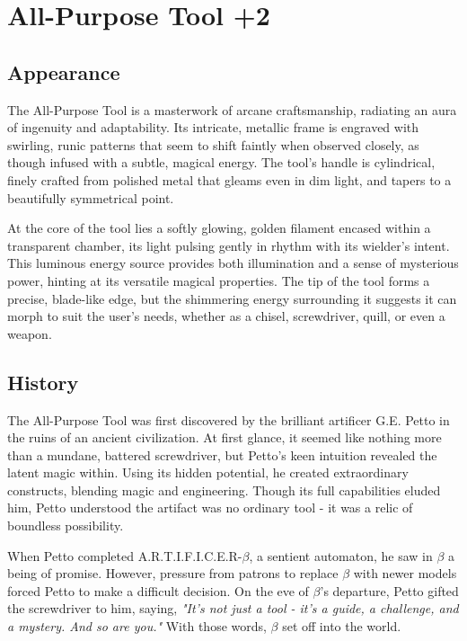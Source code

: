 \ItemSubCategory{}

\chapter*{All-Purpose Tool +2}
\section*{Appearance}
The All-Purpose Tool is a masterwork of arcane craftsmanship, radiating an aura of ingenuity and adaptability. Its intricate, metallic frame is engraved with swirling, runic patterns that seem to shift faintly when observed closely, as though infused with a subtle, magical energy. The tool's handle is cylindrical, finely crafted from polished metal that gleams even in dim light, and tapers to a beautifully symmetrical point.

At the core of the tool lies a softly glowing, golden filament encased within a transparent chamber, its light pulsing gently in rhythm with its wielder's intent. This luminous energy source provides both illumination and a sense of mysterious power, hinting at its versatile magical properties. The tip of the tool forms a precise, blade-like edge, but the shimmering energy surrounding it suggests it can morph to suit the user's needs, whether as a chisel, screwdriver, quill, or even a weapon.

\section*{History}
The All-Purpose Tool was first discovered by the brilliant artificer G.E. Petto in the ruins of an ancient civilization. At first glance, it seemed like nothing more than a mundane, battered screwdriver, but Petto's keen intuition revealed the latent magic within. Using its hidden potential, he created extraordinary constructs, blending magic and engineering. Though its full capabilities eluded him, Petto understood the artifact was no ordinary tool - it was a relic of boundless possibility.

When Petto completed A.R.T.I.F.I.C.E.R-$\beta$, a sentient automaton, he saw in $\beta$ a being of promise. However, pressure from patrons to replace $\beta$ with newer models forced Petto to make a difficult decision. On the eve of $\beta$'s departure, Petto gifted the screwdriver to him, saying, \textit{"It's not just a tool - it's a guide, a challenge, and a mystery. And so are you."} With those words, $\beta$ set off into the world.

